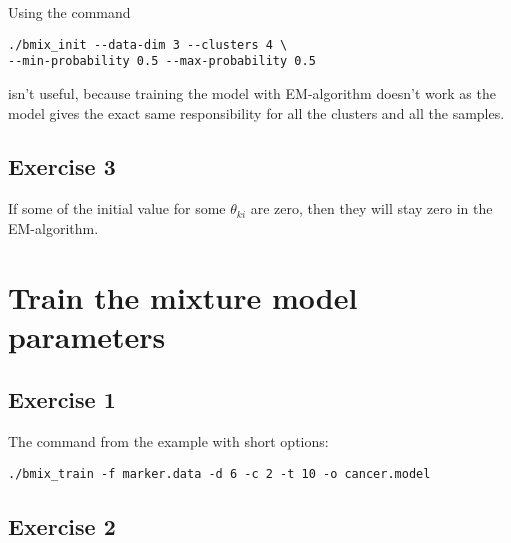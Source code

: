 \documentclass[a4paper,oneside,article]{memoir}
\begin{document}
Using the command
\begin{lstlisting}
./bmix_init --data-dim 3 --clusters 4 \
--min-probability 0.5 --max-probability 0.5
\end{lstlisting}
isn't useful, because training the model with EM-algorithm doesn't work as the model gives the exact same responsibility for all the clusters and all the samples.

\subsection*{Exercise 3}
If some of the initial value for some $\theta_{ki}$ are zero, 
then they will stay zero in the EM-algorithm.

\section{Train the mixture model parameters}

\subsection*{Exercise 1}
The command from the example with short options:
\begin{lstlisting}
./bmix_train -f marker.data -d 6 -c 2 -t 10 -o cancer.model
\end{lstlisting}

\subsection*{Exercise 2}
\end{document}
